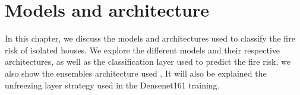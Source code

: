 %

\chapter{Models and architecture}
\label{cha:models-architecture}

In this chapter, we discuss the models and architectures used to classify
the fire risk of isolated houses. We explore the different models and
their respective architectures, as well as the classification layer used
to predict the fire risk, we also show the ensembles architecture used
. It will also be explained the unfreezing layer
strategy used in the Densenet161 training.


